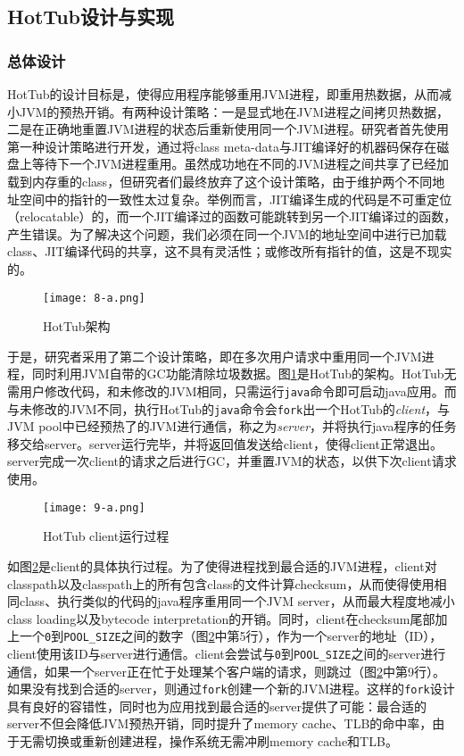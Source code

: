 \documentclass[lang=cn,12pt,a4paper,cite=authoryear]{elegantpaper}
\begin{document}
\subsection{HotTub设计与实现}
\subsubsection{总体设计}
HotTub的设计目标是，使得应用程序能够重用JVM进程，即重用热数据，从而减小JVM的预热开销。有两种设计策略：一是显式地在JVM进程之间拷贝热数据，二是在正确地重置JVM进程的状态后重新使用同一个JVM进程。研究者首先使用第一种设计策略进行开发，通过将class meta-data与JIT编译好的机器码保存在磁盘上等待下一个JVM进程重用。虽然成功地在不同的JVM进程之间共享了已经加载到内存重的class，但研究者们最终放弃了这个设计策略，由于维护两个不同地址空间中的指针的一致性太过复杂。举例而言，JIT编译生成的代码是不可重定位（relocatable）的，而一个JIT编译过的函数可能跳转到另一个JIT编译过的函数，产生错误。为了解决这个问题，我们必须在同一个JVM的地址空间中进行已加载class、JIT编译代码的共享，这不具有灵活性；或修改所有指针的值，这是不现实的。

\begin{figure}[!htp]
  \centering
  \texttt{[image: 8-a.png]}
  \caption{HotTub架构}
  \label{fig:arch}
\end{figure}

于是，研究者采用了第二个设计策略，即在多次用户请求中重用同一个JVM进程，同时利用JVM自带的GC功能清除垃圾数据。图\ref{fig:arch}是HotTub的架构。HotTub无需用户修改代码，和未修改的JVM相同，只需运行\texttt{java}命令即可启动java应用。而与未修改的JVM不同，执行HotTub的\texttt{java}命令会\texttt{fork}出一个HotTub的\textit{client}，与JVM pool中已经预热了的JVM进行通信，称之为\textit{server}，并将执行java程序的任务移交给server。server运行完毕，并将返回值发送给client，使得client正常退出。server完成一次client的请求之后进行GC，并重置JVM的状态，以供下次client请求使用。

\begin{figure}[!htp]
  \centering
  \texttt{[image: 9-a.png]}
  \caption{HotTub client运行过程}
  \label{fig:client}
\end{figure}

如图\ref{fig:client}是client的具体执行过程。为了使得进程找到最合适的JVM进程，client对classpath以及classpath上的所有包含class的文件计算checksum，从而使得使用相同class、执行类似的代码的java程序重用同一个JVM server，从而最大程度地减小class loading以及bytecode interpretation的开销。同时，client在checksum尾部加上一个\texttt{0}到\texttt{POOL\_SIZE}之间的数字（图\ref{fig:client}中第5行），作为一个server的地址（ID），client使用该ID与server进行通信。client会尝试与\texttt{0}到\texttt{POOL\_SIZE}之间的server进行通信，如果一个server正在忙于处理某个客户端的请求，则跳过（图\ref{fig:client}中第9行）。如果没有找到合适的server，则通过\texttt{fork}创建一个新的JVM进程。这样的\texttt{fork}设计具有良好的容错性，同时也为应用找到最合适的server提供了可能：最合适的server不但会降低JVM预热开销，同时提升了memory cache、TLB的命中率，由于无需切换或重新创建进程，操作系统无需冲刷memory cache和TLB。
\end{document}
